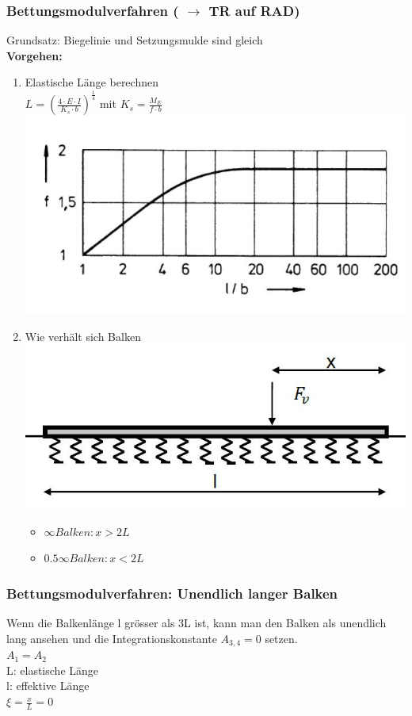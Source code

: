 \begin{multicols}{2}
	\subsubsection{Bettungsmodulverfahren ( $\rightarrow$ TR auf RAD)}
	Grundsatz: Biegelinie und Setzungsmulde sind gleich\\
	\textbf{Vorgehen:}
	\begin{enumerate}
		\item 
		Elastische Länge berechnen\\
		$L=(\frac{4\cdot E\cdot I}{K_s\cdot b})^\frac{1}{4}$ mit $K_s=\frac{M_E}{f\cdot b}$\\
		\includegraphics[width=1.0\linewidth]{images/f}
		\item 
		Wie verhält sich Balken\\
		\includegraphics[width=1.0\linewidth]{images/Balken}
		\begin{itemize}
			
			\item 
			$\infty Balken : x > 2L$
			\item 
			$0.5 \infty  Balken: x < 2L$
			
		\end{itemize}
	\end{enumerate}
	\subsubsection{Bettungsmodulverfahren: Unendlich langer Balken}
	Wenn die Balkenlänge l grösser als 3L ist, kann man den Balken als unendlich lang ansehen und die Integrationskonstante $A_{3,4} = 0$ setzen.\\
	$A_1=A_2$\\
	L: elastische Länge\\
	l: effektive Länge\\
	$\xi=\frac{x}{L} = 0$
	

\end{multicols}
